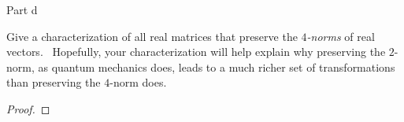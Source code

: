   \begin{solution}{Part d}\label{ques:1d}
  \begin{question}
    Give a characterization of all real matrices that preserve the
$4$\textit{-norms} of real vectors. \ Hopefully, your characterization will
help explain why preserving the $2$-norm, as quantum mechanics does, leads to
a much richer set of transformations than preserving the $4$-norm does.
  \end{question}
  \tcblower{}
  \begin{proof}
  \end{proof}
\end{solution}

